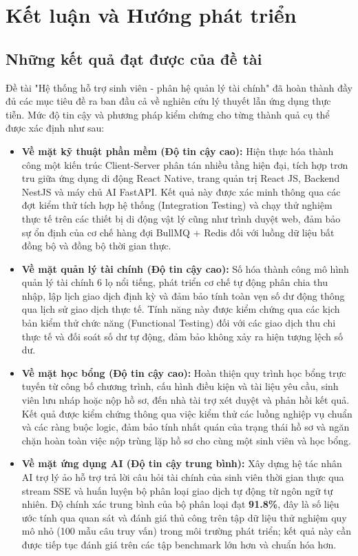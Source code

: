 \chapter{Kết luận và Hướng phát triển}
\label{ch:ket-luan}

\section{Những kết quả đạt được của đề tài}
Đề tài "Hệ thống hỗ trợ sinh viên - phân hệ quản lý tài chính" đã hoàn thành đầy đủ các mục tiêu đề ra ban đầu cả về nghiên cứu lý thuyết lẫn ứng dụng thực tiễn. Mức độ tin cậy và phương pháp kiểm chứng cho từng thành quả cụ thể được xác định như sau:
\begin{itemize}
    \item \textbf{Về mặt kỹ thuật phần mềm (Độ tin cậy cao):} Hiện thực hóa thành công một kiến trúc Client-Server phân tán nhiều tầng hiện đại, tích hợp trơn tru giữa ứng dụng di động React Native, trang quản trị React JS, Backend NestJS và máy chủ AI FastAPI. Kết quả này được xác minh thông qua các đợt kiểm thử tích hợp hệ thống (Integration Testing) và chạy thử nghiệm thực tế trên các thiết bị di động vật lý cũng như trình duyệt web, đảm bảo sự ổn định của cơ chế hàng đợi BullMQ + Redis đối với luồng dữ liệu bất đồng bộ và đồng bộ thời gian thực.
    \item \textbf{Về mặt quản lý tài chính (Độ tin cậy cao):} Số hóa thành công mô hình quản lý tài chính 6 lọ nổi tiếng, phát triển cơ chế tự động phân chia thu nhập, lập lịch giao dịch định kỳ và đảm bảo tính toàn vẹn số dư động thông qua lịch sử giao dịch thực tế. Tính năng này được kiểm chứng qua các kịch bản kiểm thử chức năng (Functional Testing) đối với các giao dịch thu chi thực tế và đối soát số dư tự động, đảm bảo không xảy ra hiện tượng lệch số dư.
    \item \textbf{Về mặt học bổng (Độ tin cậy cao):} Hoàn thiện quy trình học bổng trực tuyến từ công bố chương trình, cấu hình điều kiện và tài liệu yêu cầu, sinh viên lưu nháp hoặc nộp hồ sơ, đến nhà tài trợ xét duyệt và phản hồi kết quả. Kết quả được kiểm chứng thông qua việc kiểm thử các luồng nghiệp vụ chuẩn và các ràng buộc logic, đảm bảo tính nhất quán của trạng thái hồ sơ và ngăn chặn hoàn toàn việc nộp trùng lặp hồ sơ cho cùng một sinh viên và học bổng.
    \item \textbf{Về mặt ứng dụng AI (Độ tin cậy trung bình):} Xây dựng hệ tác nhân AI trợ lý ảo hỗ trợ trả lời câu hỏi tài chính của sinh viên thời gian thực qua stream SSE và huấn luyện bộ phân loại giao dịch tự động từ ngôn ngữ tự nhiên. Độ chính xác trung bình của bộ phân loại đạt \textbf{91.8\%}, đây là số liệu ước tính qua quan sát và đánh giá thủ công trên tập dữ liệu thử nghiệm quy mô nhỏ (100 mẫu câu truy vấn) trong môi trường phát triển; kết quả này cần được tiếp tục đánh giá trên các tập benchmark lớn hơn và chuẩn hóa hơn.

\end{itemize}
